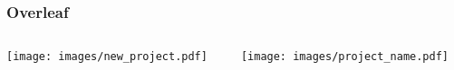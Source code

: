 \copyrightTim

\begin{frame}
	\frametitle{Overleaf}
	\begin{columns}
		\begin{column}{0.4\textwidth}
		  \texttt{[image: images/new\_project.pdf]}\hfill
		\end{column}
		\begin{column}{0.4\textwidth}
		  \texttt{[image: images/project\_name.pdf]}
		\end{column}
	\end{columns}
\end{frame}